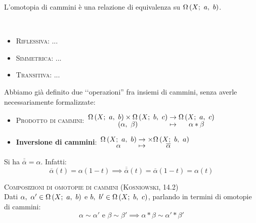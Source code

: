 \begin{observe}
	L'omotopia di cammini è una relazione di equivalenza su $\Omega\left(X;\ a,\ b\right)$.
\end{observe}
\begin{demonstration}~{}
	\begin{itemize}
		\item \textsc{Riflessiva}: ...
		\item \textsc{Simmetrica}: ...
		\item \textsc{Transitiva}: ...
	\end{itemize}
\end{demonstration}
\begin{remember}
Abbiamo già definito due ‘‘operazioni'' fra insiemi di cammini, senza averle necessariamente formalizzate:
\begin{itemize}
\item \textsc{Prodotto di cammini}: $\funztot{\ }{\inscam{X}{a}{b}\times\inscam{X}{b}{c}}{\inscam{X}{a}{c}}{\left(\alpha,\ \beta\right)}{\alpha\ast\beta}$
\item \textbf{Inversione di cammini}: $\funztot{\ }{\inscam{X}{a}{b}}{\times\inscam{X}{b}{a}}{\alpha}{\overline{\alpha}}$
\end{itemize}
\end{remember}
\begin{observe}
Si ha $\overline{\overline{\alpha}}=\alpha$. Infatti:
\begin{equation*}
	\overline{\alpha}\left(t\right)=\alpha\left(1-t\right)\implies\overline{\overline{\alpha}}\left(t\right)=\overline{\alpha}\left(1-t\right)=\alpha\left(t\right)
\end{equation*}
\end{observe}
\begin{lemming}\textsc{Composizioni di omotopie di cammini (Kosniowski, 14.2)\label{compoomotopecammini}}\\
	Dati $\alpha,\ \alpha'\in\inscam{X}{a}{b}$ e $b,\ b'\in\inscam{X}{b}{c}$, parlando in termini di omotopie di cammini:
	\begin{equation}
		\alpha\sim \alpha'\text{ e }\beta\sim \beta'\implies \alpha\ast\beta\sim\alpha'\ast\beta'
	\end{equation}
\vspace{-8mm}
\end{lemming}
